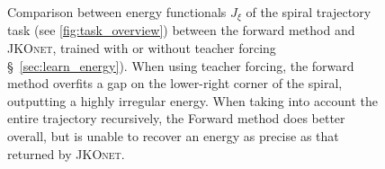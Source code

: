 \begin{figure}[ht]
\caption{Comparison between energy functionals $J_\xi$ of the spiral trajectory task (see \ref{fig:task_overview}) between the forward method and \textsc{JKOnet}, trained with or without teacher forcing \S~\ref{sec:learn_energy}). When using teacher forcing, the forward method overfits a gap on the lower-right corner of the spiral, outputting a highly irregular energy. When taking into account the entire trajectory recursively, the Forward method does better overall, but is unable to recover an energy as precise as that returned by \textsc{JKOnet}.}
\label{fig:exp_comp_spiral}
\end{figure}

